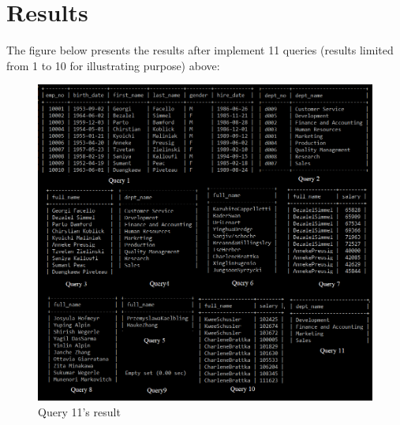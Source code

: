 \documentclass{article}
\begin{document}
\section*{Results}

The figure below presents the results after implement 11 queries (results limited from 1 to 10 for illustrating purpose) above:\\
\begin{figure}
\includegraphics[scale = 0.65]{result.PNG}
\caption{Query 11's result}
\end{figure}
\end{document}
